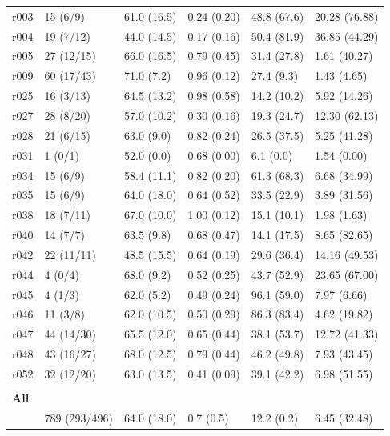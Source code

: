 \documentclass[phd,tocprelim]{cornell}
\begin{document}
\begin{table}[h]
\begin{tabular}{llllll}
r003 & 15 (6/9) & 61.0 (16.5) & 0.24 (0.20) & 48.8 (67.6) & 20.28 (76.88) \\
r004 & 19 (7/12) & 44.0 (14.5) & 0.17 (0.16) & 50.4 (81.9) & 36.85 (44.29) \\
r005 & 27 (12/15) & 66.0 (16.5) & 0.79 (0.45) & 31.4 (27.8) & 1.61 (40.27) \\
r009 & 60 (17/43) & 71.0 (7.2) & 0.96 (0.12) & 27.4 (9.3) & 1.43 (4.65) \\
r025 & 16 (3/13) & 64.5 (13.2) & 0.98 (0.58) & 14.2 (10.2) & 5.92 (14.26) \\
r027 & 28 (8/20) & 57.0 (10.2) & 0.30 (0.16) & 19.3 (24.7) & 12.30 (62.13) \\
r028 & 21 (6/15) & 63.0 (9.0) & 0.82 (0.24) & 26.5 (37.5) & 5.25 (41.28) \\
r031 & 1 (0/1) & 52.0 (0.0) & 0.68 (0.00) & 6.1 (0.0) & 1.54 (0.00) \\
r034 & 15 (6/9) & 58.4 (11.1) & 0.82 (0.20) & 61.3 (68.3) & 6.68 (34.99) \\
r035 & 15 (6/9) & 64.0 (18.0) & 0.64 (0.52) & 33.5 (22.9) & 3.89 (31.56) \\
r038 & 18 (7/11) & 67.0 (10.0) & 1.00 (0.12) & 15.1 (10.1) & 1.98 (1.63) \\
r040 & 14 (7/7) & 63.5 (9.8) & 0.68 (0.47) & 14.1 (17.5) & 8.65 (82.65) \\
r042 & 22 (11/11) & 48.5 (15.5) & 0.64 (0.19) & 29.6 (36.4) & 14.16 (49.53) \\
r044 & 4 (0/4) & 68.0 (9.2) & 0.52 (0.25) & 43.7 (52.9) & 23.65 (67.00) \\
r045 & 4 (1/3) & 62.0 (5.2) & 0.49 (0.24) & 96.1 (59.0) & 7.97 (6.66) \\
r046 & 11 (3/8) & 62.0 (10.5) & 0.50 (0.29) & 86.3 (83.4) & 4.62 (19.82) \\
r047 & 44 (14/30) & 65.5 (12.0) & 0.65 (0.44) & 38.1 (53.7) & 12.72 (41.33) \\
r048 & 43 (16/27) & 68.0 (12.5) & 0.79 (0.44) & 46.2 (49.8) & 7.93 (43.45) \\
r052 & 32 (12/20) & 63.0 (13.5) & 0.41 (0.09) & 39.1 (42.2) & 6.98 (51.55) \\
 & & & & &\\
\textbf{All}  & & & & &\\
\arrayrulecolor{black!30}\midrule
& 789 (293/496) & 64.0 (18.0) & 0.7 (0.5) & 12.2 (0.2) & 6.45 (32.48) \\
\bottomrule
\end{tabular}
\end{table}
\end{document}
